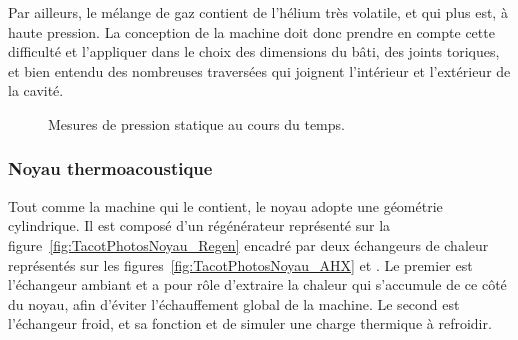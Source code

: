 Par ailleurs, le mélange de gaz contient de l'hélium très volatile, et qui plus est, à haute pression. La conception de la machine doit donc prendre en compte cette difficulté et l'appliquer dans le choix des dimensions du bâti, des joints toriques, et bien entendu des nombreuses traversées qui joignent l'intérieur et l'extérieur de la cavité. 

\begin{figure}[!ht]
	\centering
	\externalremake
	
	\caption{Mesures de pression statique au cours du temps. }
	\label{fig:TenuePressionStatiqueTACOT}
\end{figure}

\subsubsection{Noyau thermoacoustique}
Tout comme la machine qui le contient, le noyau adopte une géométrie cylindrique. Il est composé d'un régénérateur représenté sur la figure~\ref{fig:TacotPhotosNoyau_Regen} encadré par deux échangeurs de chaleur représentés sur les figures~\ref{fig:TacotPhotosNoyau_AHX} et . Le premier est l'échangeur ambiant et a pour rôle d'extraire la chaleur qui s'accumule de ce côté du noyau, afin d'éviter l'échauffement global de la machine. Le second est l'échangeur froid, et sa fonction et de simuler une charge thermique à refroidir. 

